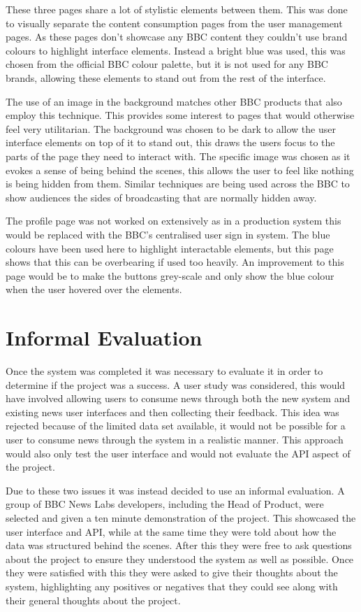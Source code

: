 \documentclass[12pt,titlepage]{article}
\begin{document}
    These three pages share a lot of stylistic elements between them. This was
    done to visually separate the content consumption pages from the user
    management pages. As these pages don't showcase any BBC content they
    couldn't use brand colours to highlight interface elements. Instead a bright
    blue was used, this was chosen from the official BBC colour palette, but it
    is not used for any BBC brands, allowing these elements to stand out from
    the rest of the interface.

    The use of an image in the background matches other BBC products that also
    employ this technique. This provides some interest to pages that would
    otherwise feel very utilitarian. The background was chosen to be dark to
    allow the user interface elements on top of it to stand out, this draws the
    users focus to the parts of the page they need to interact with. The
    specific image was chosen as it evokes a sense of being behind the scenes,
    this allows the user to feel like nothing is being hidden from them.
    Similar techniques are being used across the BBC to show audiences the
    sides of broadcasting that are normally hidden away.

    The profile page was not worked on extensively as in a production system
    this would be replaced with the BBC's centralised user sign in system. The
    blue colours have been used here to highlight interactable elements, but
    this page shows that this can be overbearing if used too heavily. An
    improvement to this page would be to make the buttons grey-scale and only
    show the blue colour when the user hovered over the elements.

\section{Informal Evaluation}

  Once the system was completed it was necessary to evaluate it in order to
  determine if the project was a success. A user study was considered, this would
  have involved allowing users to consume news through both the new system and
  existing news user interfaces and then collecting their feedback. This idea
  was rejected because of the limited data set available, it would not be
  possible for a user to consume news through the system in a realistic manner.
  This approach would also only test the user interface and would not evaluate
  the API aspect of the project.

  Due to these two issues it was instead decided to use an informal evaluation.
  A group of BBC News Labs developers, including the Head of Product, were
  selected and given a ten minute demonstration of the project. This showcased
  the user interface and API, while at the same time they were told about how
  the data was structured behind the scenes. After this they were free to ask
  questions about the project to ensure they understood the system as well as
  possible. Once they were satisfied with this they were asked to give their
  thoughts about the system, highlighting any positives or negatives that they
  could see along with their general thoughts about the project.
\end{document}
